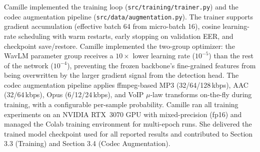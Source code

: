 \documentclass[10pt,twocolumn,a4paper]{article}
\begin{document}
Camille implemented the training loop (\texttt{src/training/trainer.py}) and the codec augmentation pipeline (\texttt{src/data/augmentation.py}). The trainer supports gradient accumulation (effective batch 64 from micro-batch 16), cosine learning-rate scheduling with warm restarts, early stopping on validation EER, and checkpoint save/restore. Camille implemented the two-group optimizer: the WavLM parameter group receives a $10\times$ lower learning rate ($10^{-5}$) than the rest of the network ($10^{-4}$), preventing the frozen backbone's fine-grained features from being overwritten by the larger gradient signal from the detection head. The codec augmentation pipeline applies ffmpeg-based MP3 (32/64/128\,kbps), AAC (32/64\,kbps), Opus (6/12/24\,kbps), and VoIP $\mu$-law transforms on-the-fly during training, with a configurable per-sample probability. Camille ran all training experiments on an NVIDIA RTX~3070 GPU with mixed-precision (fp16) and managed the Colab training environment for multi-epoch runs. She delivered the trained model checkpoint used for all reported results and contributed to Section 3.3 (Training) and Section 3.4 (Codec Augmentation).
\end{document}
